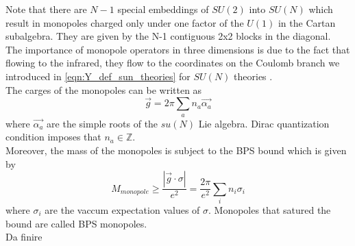 Note that there are $N-1$ special embeddings of $SU(2)$ into $SU(N)$ which result in monopoles charged only under one factor of the $U(1)$ in the Cartan subalgebra. They are given by the N-1 contiguous 2x2 blocks in the diagonal.\\
The importance of monopole operators in three dimensions is due to the fact that flowing to the infrared, they flow to the coordinates on the Coulomb branch we introduced in \eqref{eqn:Y_def_sun_theories} for $SU(N)$ theories \cite{Aharony:2013dha}.
\\
The carges of the monopoles can be written as
\begin{equation}
\vec{g}  = 2 \pi \sum_a n_a \vec{\alpha_a}
\end{equation}
where $\vec{\alpha_a}$ are the simple roots of the $su(N)$ Lie algebra. Dirac quantization condition imposes that $n_a \in \mathbb{Z}$.\\
Moreover, the mass of the monopoles is subject to the BPS bound which is given by
\begin{equation}
M_{monopole} \geq \frac{| \vec{g} \cdot \sigma| }{e^2} = \frac{2 \pi}{e^2} \sum_i n_i \sigma_i
\end{equation}
where $\sigma_i$ are the vaccum expectation values of $\sigma$.
Monopoles that satured the bound are called BPS monopoles.\\





{\huge Da finire}
 
 
 




































